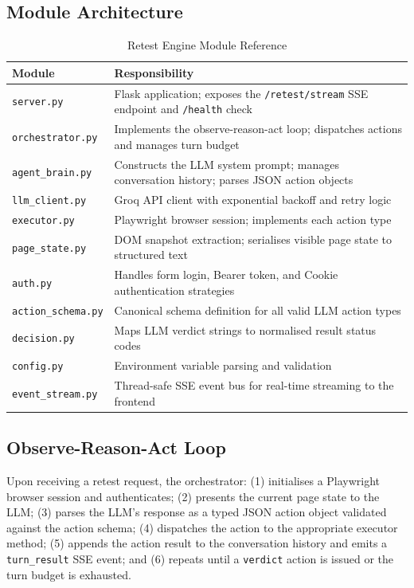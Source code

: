 \subsection{Module Architecture}

\begin{table}[h!]
\centering
\caption{Retest Engine Module Reference}
\label{tab:engine_modules}
\begin{tabular}{|l|p{9cm}|}
\hline
\textbf{Module} & \textbf{Responsibility} \\
\hline
\texttt{server.py} & Flask application; exposes the \texttt{/retest/stream} SSE endpoint and \texttt{/health} check \\
\texttt{orchestrator.py} & Implements the observe-reason-act loop; dispatches actions and manages turn budget \\
\texttt{agent\_brain.py} & Constructs the LLM system prompt; manages conversation history; parses JSON action objects \\
\texttt{llm\_client.py} & Groq API client with exponential backoff and retry logic \\
\texttt{executor.py} & Playwright browser session; implements each action type \\
\texttt{page\_state.py} & DOM snapshot extraction; serialises visible page state to structured text \\
\texttt{auth.py} & Handles form login, Bearer token, and Cookie authentication strategies \\
\texttt{action\_schema.py} & Canonical schema definition for all valid LLM action types \\
\texttt{decision.py} & Maps LLM verdict strings to normalised result status codes \\
\texttt{config.py} & Environment variable parsing and validation \\
\texttt{event\_stream.py} & Thread-safe SSE event bus for real-time streaming to the frontend \\
\hline
\end{tabular}
\end{table}

\subsection{Observe-Reason-Act Loop}

Upon receiving a retest request, the orchestrator: (1) initialises a Playwright browser session and authenticates; (2) presents the current page state to the LLM; (3) parses the LLM's response as a typed JSON action object validated against the action schema; (4) dispatches the action to the appropriate executor method; (5) appends the action result to the conversation history and emits a \texttt{turn\_result} SSE event; and (6) repeats until a \texttt{verdict} action is issued or the turn budget is exhausted.

